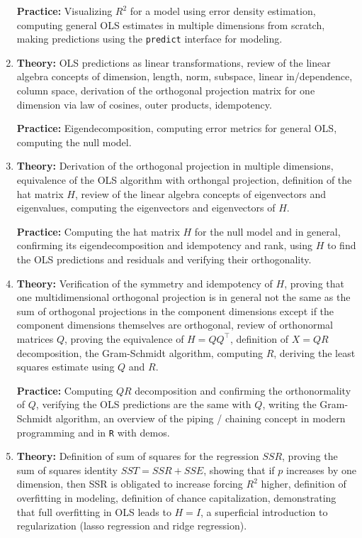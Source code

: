 \begin{enumerate}[(1)]
\textbf{Practice:} Visualizing $R^2$ for a model using error density estimation, computing general OLS estimates in multiple dimensions from scratch, making predictions using the \texttt{predict} interface for modeling.

\item \textbf{Theory:} OLS predictions as linear transformations, review of the linear algebra concepts of dimension, length, norm, subspace, linear in/dependence, column space, derivation of the orthogonal projection matrix for one dimension via law of cosines, outer products, idempotency.

\textbf{Practice:} Eigendecomposition, computing error metrics for general OLS, computing the null model.

\item \textbf{Theory:} Derivation of the orthogonal projection in multiple dimensions, equivalence of the OLS algorithm with orthongal projection, definition of the hat matrix $H$, review of the linear algebra concepts of eigenvectors and eigenvalues, computing the eigenvectors and eigenvectors of $H$.

\textbf{Practice:} Computing the hat matrix $H$ for the null model and in general, confirming its eigendecomposition and idempotency and rank, using $H$ to find the OLS predictions and residuals and verifying their orthogonality.

\item \textbf{Theory:} Verification of the symmetry and idempotency of $H$, proving that one multidimensional orthogonal projection is in general not the same as the sum of orthogonal projections in the component dimensions except if the component dimensions themselves are orthogonal, review of orthonormal matrices $Q$, proving the equivalence of $H = QQ^\top$, definition of $X = QR$ decomposition, the Gram-Schmidt algorithm, computing $R$, deriving the least squares estimate using $Q$ and $R$.

\textbf{Practice:} Computing $QR$ decomposition and confirming the orthonormality of $Q$, verifying the OLS predictions are the same with $Q$, writing the Gram-Schmidt algorithm, an overview of the piping / chaining concept in modern programming and in \texttt{R} with demos. 

\item \textbf{Theory:} Definition of sum of squares for the regression $SSR$, proving the sum of squares identity $SST = SSR + SSE$, showing that if $p$ increases by one dimension, then SSR is obligated to increase forcing $R^2$ higher, definition of overfitting in modeling, definition of chance capitalization, demonstrating that full overfitting in OLS leads to $H = I$, a superficial introduction to regularization (lasso regression and ridge regression).


\end{enumerate}
